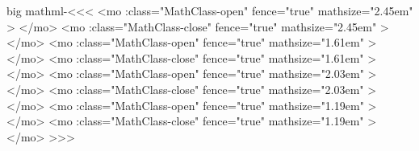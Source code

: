 {{{{{{\<big mathml-\><<<
   {\bgroup
          {<mo \mml:class="MathClass-open" 
                     fence="true" mathsize="2.45em" >}
          {</mo>}
          {}%
   }
   {\egroup}
   {\bgroup
          {<mo \mml:class="MathClass-close"
                     fence="true" mathsize="2.45em" >}
          {</mo>}
          {}%
   }
   {\egroup}
   {\bgroup
          {<mo \mml:class="MathClass-open"
                     fence="true" mathsize="1.61em" >}
          {</mo>}
          {}%
   }
   {\egroup}
   {\bgroup
          {<mo \mml:class="MathClass-close"
                     fence="true" mathsize="1.61em" >}
          {</mo>}
          {}%
   }
   {\egroup}
   {\bgroup
          {<mo \mml:class="MathClass-open"
                     fence="true" mathsize="2.03em" >}
          {</mo>}
          {}%
   }
   {\egroup}
   {\bgroup
          {<mo \mml:class="MathClass-close"
                     fence="true" mathsize="2.03em" >}
          {</mo>}
          {}%
   }
   {\egroup}
   {\bgroup
          {<mo \mml:class="MathClass-open"
                     fence="true" mathsize="1.19em" >}
          {</mo>}
          {}%
   }
   {\egroup}
   {\bgroup
          {<mo \mml:class="MathClass-close"
                     fence="true" mathsize="1.19em" >}
          {</mo>}
          {}%
   }
   {\egroup}
>>>



}}}}}}
